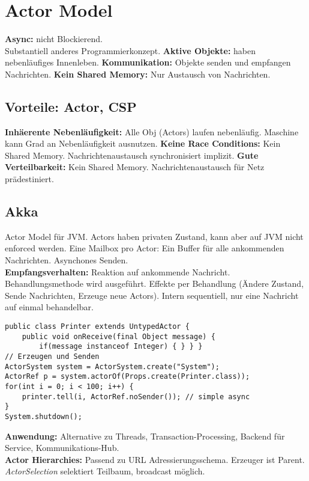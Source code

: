 \section{Actor Model}
\textbf{Async:} nicht Blockierend.\\
Substantiell anderes Programmierkonzept.
\textbf{Aktive Objekte:} haben nebenläufiges Innenleben.
\textbf{Kommunikation:} Objekte senden und empfangen Nachrichten.
\textbf{Kein Shared Memory:} Nur Austausch von Nachrichten.

\subsection{Vorteile: Actor, CSP} 
\textbf{Inhäerente Nebenläufigkeit:} Alle Obj (Actors) laufen nebenläufig.
Maschine kann Grad an Nebenläufigkeit ausnutzen.
\textbf{Keine Race Conditions:} Kein Shared Memory. Nachrichtenaustausch synchronisiert implizit.
\textbf{Gute Verteilbarkeit:} Kein Shared Memory. 
Nachrichtenaustausch für Netz prädestiniert.

\subsection{Akka}
Actor Model für JVM. Actors haben privaten Zustand, kann aber auf JVM nicht enforced werden.
Eine Mailbox pro Actor: Ein Buffer für alle ankommenden Nachrichten. Asynchones Senden.\\ 
\textbf{Empfangsverhalten:} Reaktion auf ankommende Nachricht. Behandlungsmethode wird ausgeführt.
Effekte per Behandlung (Ändere Zustand, Sende Nachrichten, Erzeuge neue Actors).
Intern sequentiell, nur eine Nachricht auf einmal behandelbar.
\begin{lstlisting}
public class Printer extends UntypedActor {
    public void onReceive(final Object message) {
        if(message instanceof Integer) { } } }
// Erzeugen und Senden
ActorSystem system = ActorSystem.create("System");
ActorRef p = system.actorOf(Props.create(Printer.class));
for(int i = 0; i < 100; i++) {
    printer.tell(i, ActorRef.noSender()); // simple async
}
System.shutdown();
\end{lstlisting}

\textbf{Anwendung:}
Alternative zu Threads, Transaction-Processing, 
Backend für Service, Kommunikations-Hub.\\ 
\textbf{Actor Hierarchies:}
Passend zu URL Adressierungsschema. Erzeuger ist Parent. 
\textit{ActorSelection} selektiert Teilbaum, broadcast möglich.
